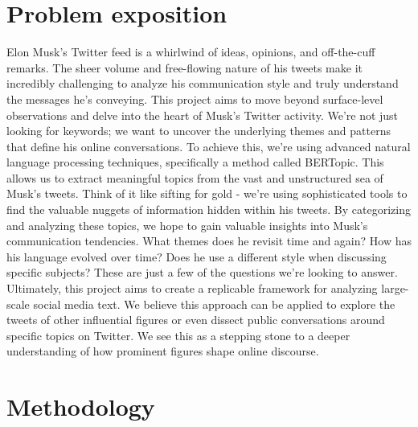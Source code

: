 \documentclass[12pt]{article}
\begin{document}
\section{Problem exposition} 
\par
Elon Musk's Twitter feed is a whirlwind of ideas, opinions, and off-the-cuff remarks. The sheer volume and free-flowing nature of his tweets make it incredibly challenging to analyze his communication style and truly understand the messages he's conveying. This project aims to move beyond surface-level observations and delve into the heart of Musk's Twitter activity. We're not just looking for keywords; we want to uncover the underlying themes and patterns that define his online conversations. To achieve this, we're using advanced natural language processing techniques, specifically a method called BERTopic. This allows us to extract meaningful topics from the vast and unstructured sea of Musk's tweets. Think of it like sifting for gold - we're using sophisticated tools to find the valuable nuggets of information hidden within his tweets. By categorizing and analyzing these topics, we hope to gain valuable insights into Musk's communication tendencies. What themes does he revisit time and again? How has his language evolved over time? Does he use a different style when discussing specific subjects? These are just a few of the questions we're looking to answer. Ultimately, this project aims to create a replicable framework for analyzing large-scale social media text. We believe this approach can be applied to explore the tweets of other influential figures or even dissect public conversations around specific topics on Twitter. We see this as a stepping stone to a deeper understanding of how prominent figures shape online discourse.
\newpage
\section{Methodology}
\end{document}

